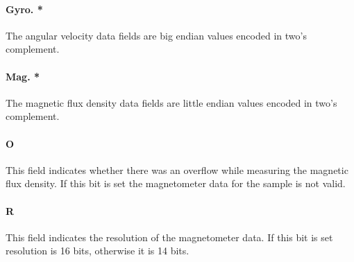 \paragraph{Gyro. *}
The angular velocity data fields are big endian values encoded in two's complement.

\paragraph{Mag. *}
The magnetic flux density data fields are little endian values encoded in two's complement.

\paragraph{O}
This field indicates whether there was an overflow while measuring the magnetic flux density. If this bit is set the
magnetometer data for the sample is not valid.

\paragraph{R}
This field indicates the resolution of the magnetometer data. If this bit is set resolution is 16 bits, otherwise it is
14 bits.
